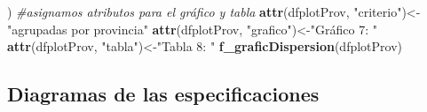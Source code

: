 \documentclass[
]{article}
\newenvironment{Shaded}{\begin{snugshade}}{\end{snugshade}}
\newcommand{\CommentTok}[1]{\textcolor[rgb]{0.56,0.35,0.01}{\textit{#1}}}
\newcommand{\FunctionTok}[1]{\textcolor[rgb]{0.13,0.29,0.53}{\textbf{#1}}}
\newcommand{\NormalTok}[1]{#1}
\newcommand{\OtherTok}[1]{\textcolor[rgb]{0.56,0.35,0.01}{#1}}
\newcommand{\StringTok}[1]{\textcolor[rgb]{0.31,0.60,0.02}{#1}}
\begin{document}
\begin{Shaded}
\begin{Highlighting}[]
\NormalTok{                  )}
\CommentTok{\#asignamos atributos para el gráfico y tabla}
\FunctionTok{attr}\NormalTok{(dfplotProv, }\StringTok{"criterio"}\NormalTok{)}\OtherTok{\textless{}{-}}\StringTok{"agrupadas por provincia"}
\FunctionTok{attr}\NormalTok{(dfplotProv, }\StringTok{"grafico"}\NormalTok{)}\OtherTok{\textless{}{-}}\StringTok{"Gráfico 7: "}
\FunctionTok{attr}\NormalTok{(dfplotProv, }\StringTok{"tabla"}\NormalTok{)}\OtherTok{\textless{}{-}}\StringTok{"Tabla 8: "}
\FunctionTok{f\_graficDispersion}\NormalTok{(dfplotProv)}
\end{Highlighting}
\end{Shaded}

\hypertarget{diagramas-de-las-especificaciones}{%
\subsection{Diagramas de las
especificaciones}\label{diagramas-de-las-especificaciones}}
\end{document}
